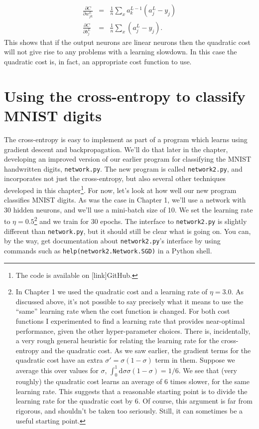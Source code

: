 \documentclass[a4paper,twoside,10pt]{book}
\begin{document}
\begin{itemize}
	\begin{eqnarray}
	\frac{\partial C}{\partial w^L_{jk}} & = & \frac{1}{n} \sum_x a^{L-1}_k  (a^L_j-y_j)\\
	\frac{\partial C}{\partial b^L_{j}} & = & \frac{1}{n} \sum_x (a^L_j-y_j).
	\label{eq:70}
	\end{eqnarray}
	This shows that if the output neurons are linear neurons then the quadratic cost will not give rise to any problems with a learning slowdown. In this case the quadratic cost is, in fact, an appropriate cost function to use.
\end{itemize}
\section{Using the cross-entropy to classify MNIST digits}
The cross-entropy is easy to implement as part of a program which learns using gradient descent and backpropagation. We'll do that later in the chapter, developing an improved version of our earlier program for classifying the MNIST handwritten digits, \texttt{network.py}. The new program is called \texttt{network2.py}, and incorporates not just the cross-entropy, but also several other techniques developed in this chapter\footnote{The code is available on [link]GitHub.}. For now, let's look at how well our new program classifies MNIST digits. As was the case in Chapter 1, we'll use a network with 30 hidden neurons, and we'll use a mini-batch size of 10. We set the learning rate to $\eta=0.5$\footnote{In Chapter 1 we used the quadratic cost and a learning rate of $\eta=3.0$. As discussed above, it's not possible to say precisely what it means to use the ``same'' learning rate when the cost function is changed. For both cost functions I experimented to find a learning rate that provides near-optimal performance, given the other hyper-parameter choices. \newline There is, incidentally, a very rough general heuristic for relating the learning rate for the cross-entropy and the quadratic cost. As we saw earlier, the gradient terms for the quadratic cost have an extra $\sigma' = \sigma(1-\sigma)$ term in them. Suppose we average this over values for $\sigma$, $\int_0^1\mathrm{d}\sigma \sigma(1-\sigma)=1/6$. We see that (very roughly) the quadratic cost learns an average of 6 times slower, for the same learning rate. This suggests that a reasonable starting point is to divide the learning rate for the quadratic cost by 6. Of course, this argument is far from rigorous, and shouldn't be taken too seriously. Still, it can sometimes be a useful starting point.} and we train for 30 epochs. The interface to \texttt{network2.py} is slightly different than \texttt{network.py}, but it should still be clear what is going on. You can, by the way, get documentation about \texttt{network2.py}'s interface by using commands such as \texttt{help(network2.Network.SGD)} in a Python shell.
\end{document}
